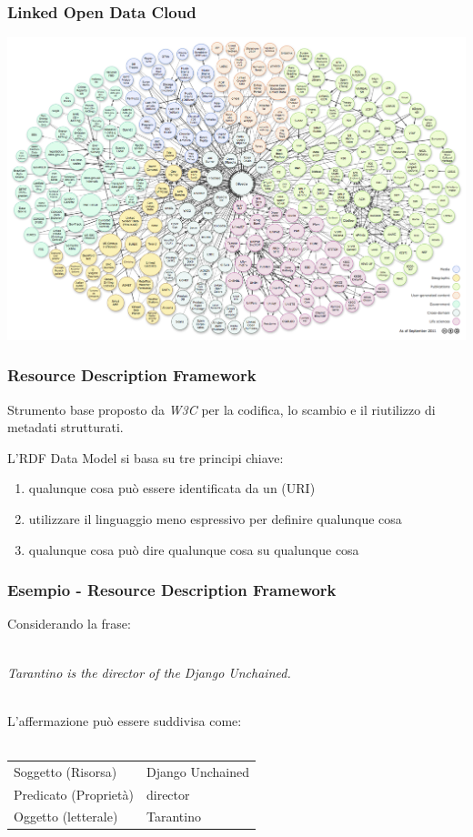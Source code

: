 \documentclass{beamer}
\begin{document}

\begin{frame}
\frametitle{Linked Open Data Cloud}
\includegraphics[width=.95\textwidth]{figure/lodcloud}
\end{frame}


\begin{frame}
\frametitle{Resource Description Framework}
Strumento base proposto da \emph{W3C} per la codifica, lo scambio e il riutilizzo di metadati strutturati.

L'RDF Data Model si basa su tre principi chiave:
\begin{enumerate}
\item qualunque cosa può essere identificata da un (URI)
\item utilizzare il linguaggio meno espressivo per definire qualunque cosa
\item qualunque cosa può dire qualunque cosa su qualunque cosa
\end{enumerate}
\end{frame}


\begin{frame}
\frametitle{Esempio - Resource Description Framework}
Considerando la frase:\\~\\
\begin{center} \emph{Tarantino is the director of the Django Unchained.} \\~\\
\end{center}
L'affermazione può essere suddivisa come: \\~\\
\begin{tabular}{ l | l }
    Soggetto (Risorsa) & Django Unchained \\
    Predicato (Proprietà) & director \\
    Oggetto (letterale) & Tarantino \\
\end{tabular}
\end{frame}
\end{document}
